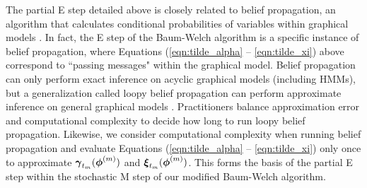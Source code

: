 

The partial E step detailed above is closely related to belief propagation, an algorithm that calculates conditional probabilities of variables within graphical models \citep{Pearl:1982}. In fact, the E step of the Baum-Welch algorithm is a specific instance of belief propagation, where Equations (\ref{eqn:tilde_alpha} -- \ref{eqn:tilde_xi}) above correspond to ``passing messages" within the graphical model. Belief propagation can only perform exact inference on acyclic graphical models (including HMMs), but a generalization called loopy belief propagation can perform approximate inference on general graphical models \citep{Pearl:1988}. Practitioners balance approximation error and computational complexity to decide how long to run loopy belief propagation. Likewise, we consider computational complexity when running belief propagation and evaluate Equations (\ref{eqn:tilde_alpha} -- \ref{eqn:tilde_xi}) only once to approximate $\boldsymbol{\gamma}_{t_m}(\boldsymbol{\phi}^{(m)})$ and $\boldsymbol{\xi}_{t_m}(\boldsymbol{\phi}^{(m)})$. This forms the basis of the partial E step within the stochastic M step of our modified Baum-Welch algorithm.

